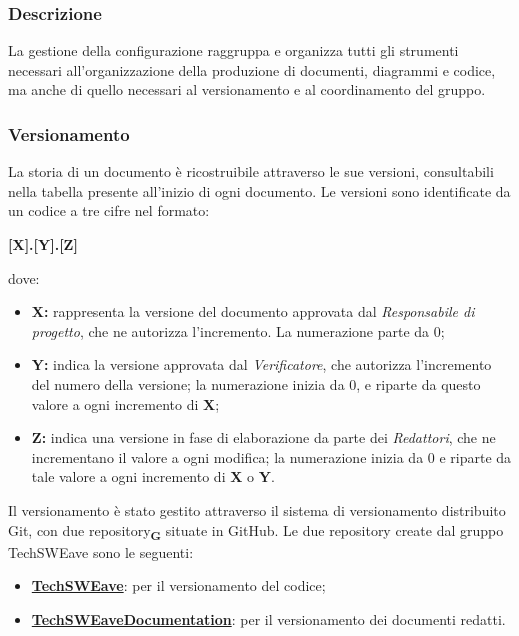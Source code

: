         \subsubsection{Descrizione}
        La gestione della configurazione raggruppa e organizza tutti gli strumenti necessari all'organizzazione della produzione di documenti, diagrammi e codice, ma anche di quello necessari al versionamento e al coordinamento del gruppo.
        \subsubsection{Versionamento}
        La storia di un documento è ricostruibile attraverso le sue versioni, consultabili nella tabella presente all'inizio di ogni documento. Le versioni sono identificate da un codice a tre cifre nel formato: 
        \begin{center}
            \textbf{\large [X].[Y].[Z]}\\             
        \end{center}
        dove: 
        \begin{itemize}
            \item \textbf{\large X:} rappresenta la versione del documento approvata dal \textit{Responsabile di progetto}, che ne autorizza l'incremento. La numerazione parte da 0;
            \item \textbf{\large Y:} indica la versione approvata dal \textit{Verificatore}, che autorizza l’incremento del numero della versione; la numerazione inizia da 0, e riparte da questo valore a ogni incremento di \textbf{X};
            \item \textbf{\large Z:} indica una versione in fase di elaborazione da parte dei \textit{Redattori}, che ne incrementano il valore a ogni modifica; la numerazione inizia da 0 e riparte da tale valore a ogni incremento di \textbf{X} o \textbf{Y}.
        \end{itemize}
        Il versionamento è stato gestito attraverso il sistema di versionamento distribuito Git, con due repository\textsubscript{\textbf{G}} situate in GitHub.
        Le due repository create dal gruppo TechSWEave sono le seguenti:
        \begin{itemize}
            \item \textbf{\href{https://github.com/techsweave/TechSWEave.git}{TechSWEave}}: per il versionamento del codice;
            \item \textbf{\href{https://github.com/techsweave/TechSWEaveDocumentation.git}{TechSWEaveDocumentation}}: per il versionamento dei documenti redatti.
        \end{itemize}
